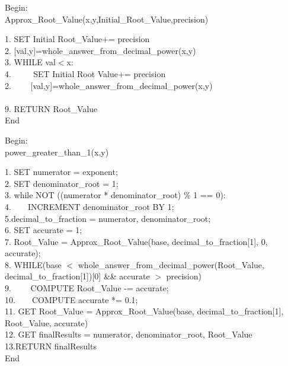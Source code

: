 \documentclass[a4paper,12pt]{article}
\begin{document}
        \vspace{0.5cm}
       
        \begin{procedure}
        Begin:\\
        \caption{ Approx\_Root\_Value(x,y,Initial\_Root_Value,precision)}
        1. SET Initial Root\_Value+= precision\\
        2. [val,y]=whole\_answer\_from\_decimal\_power(x,y)\\
        3. WHILE val$<$x:\\
        4. $\hspace{2em}$ SET Initial Root Value+= precision\\
        2. $\hspace{2em}$[val,y]=whole\_answer\_from\_decimal\_power(x,y)\\\\
        9. RETURN Root\_Value\\
        End
        \end{procedure}
       
        \vspace{0.5cm}
       
       \begin{procedure}
        Begin:\\
        \caption{ power\_greater\_than\_1(x,y)}
        1. SET numerator = exponent;\\
        2. SET denominator\_root = 1;\\
        3. while NOT ((numerator * denominator\_root) \% 1 == 0):\\
        4.$\hspace{2em}$INCREMENT denominator\_root BY 1;\\
        5.decimal\_to\_fraction = {numerator, denominator_root};\\
        6. SET accurate = 1;\\
        7. Root\_Value = Approx\_Root\_Value(base, decimal_to_fraction[1], 0, accurate);\\
        8. WHILE(base $<$ whole\_answer\_from\_decimal\_power(Root\_Value, decimal\_to\_fraction[1])[0] && accurate $>$ precision) \\
        9.$\hspace{2em}$ COMPUTE Root\_Value -= accurate;\\
        10.$\hspace{2em}$COMPUTE accurate *= 0.1;\\
        11. GET Root\_Value = Approx\_Root\_Value(base, decimal\_to\_fraction[1], Root\_Value, accurate)\\
        12. GET finalResults = {numerator, denominator\_root, Root\_Value}\\
        13.RETURN finalResults\\
        End
        \end{procedure}
       
\end{document}
